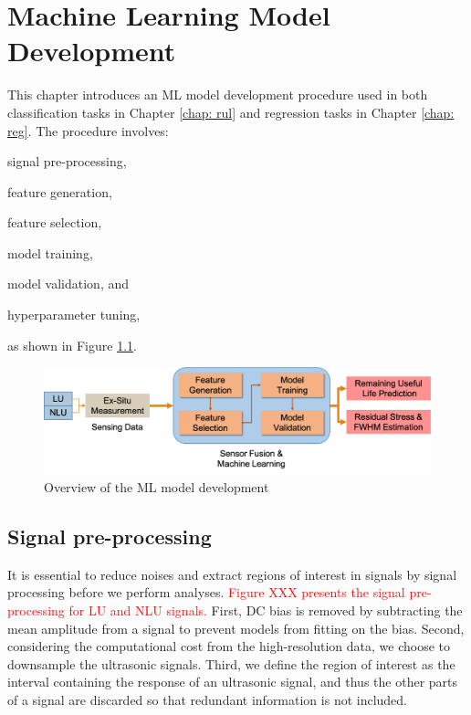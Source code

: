 \chapter{Machine Learning Model Development}
\label{chap: model}

This chapter introduces an ML model development procedure used in both classification tasks in Chapter \ref{chap: rul} and regression tasks in Chapter \ref{chap: reg}. The procedure involves:
\begin{enumerate*}[label=(\alph*)]
    \item signal pre-processing,
    \item feature generation,
    \item feature selection,
    \item model training,
    \item model validation, and
    \item hyperparameter tuning,
\end{enumerate*}
as shown in Figure \ref{fig: model development}.

\begin{figure}[tb]
    \centering
    \includegraphics[width=\linewidth]{fig/model_development.png}
    \caption{Overview of the ML model development}
    \label{fig: model development}
\end{figure}

\section{Signal pre-processing}
It is essential to reduce noises and extract regions of interest in signals by signal processing before we perform analyses. \textcolor{red}{Figure XXX presents the signal pre-processing for LU and NLU signals.} First, DC bias is removed by subtracting the mean amplitude from a signal to prevent models from fitting on the bias. Second, considering the computational cost from the high-resolution data, we choose to downsample the ultrasonic signals. Third, we define the region of interest as the interval containing the response of an ultrasonic signal, and thus the other parts of a signal are discarded so that redundant information is not included.

